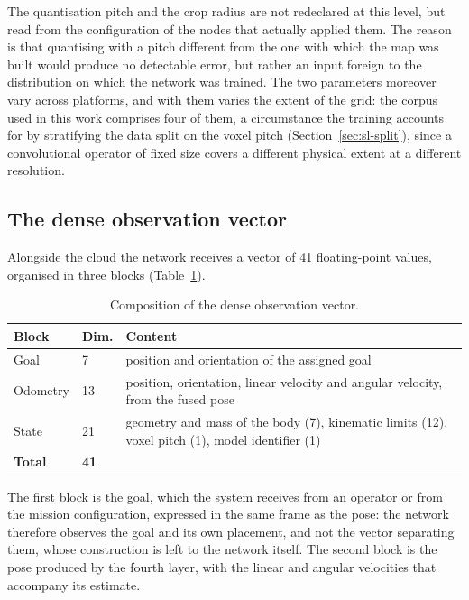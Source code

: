 The quantisation pitch and the crop radius are not redeclared at this level, but
read from the configuration of the nodes that actually applied them. The reason
is that quantising with a pitch different from the one with which the map was
built would produce no detectable error, but rather an input foreign to the
distribution on which the network was trained. The two parameters moreover vary
across platforms, and with them varies the extent of the grid: the corpus used
in this work comprises four of them, a circumstance the training accounts for by
stratifying the data split on the voxel pitch (Section~\ref{sec:sl-split}),
since a convolutional operator of fixed size covers a different physical extent
at a different resolution.

\subsection{The dense observation vector}
\label{sec:observation-vector}

Alongside the cloud the network receives a vector of \num{41} floating-point
values, organised in three blocks (Table~\ref{tab:obs}).

\begin{table}[H]
  \centering
  \caption{Composition of the dense observation vector.}
  \label{tab:obs}
  \begin{tabular}{@{}llp{7.2cm}@{}}
    \toprule
    \textbf{Block} & \textbf{Dim.} & \textbf{Content} \\
    \midrule
    Goal     & 7  & position and orientation of the assigned goal \\
    Odometry & 13 & position, orientation, linear velocity and angular velocity, from the fused pose \\
    State    & 21 & geometry and mass of the body (7), kinematic limits (12), voxel pitch (1), model identifier (1) \\
    \midrule
    \textbf{Total} & \textbf{41} & \\
    \bottomrule
  \end{tabular}
\end{table}

The first block is the goal, which the system receives from an operator or from
the mission configuration, expressed in the same frame as the pose: the network
therefore observes the goal and its own placement, and not the vector separating
them, whose construction is left to the network itself. The second block is the
pose produced by the fourth layer, with the linear and angular velocities that
accompany its estimate.

